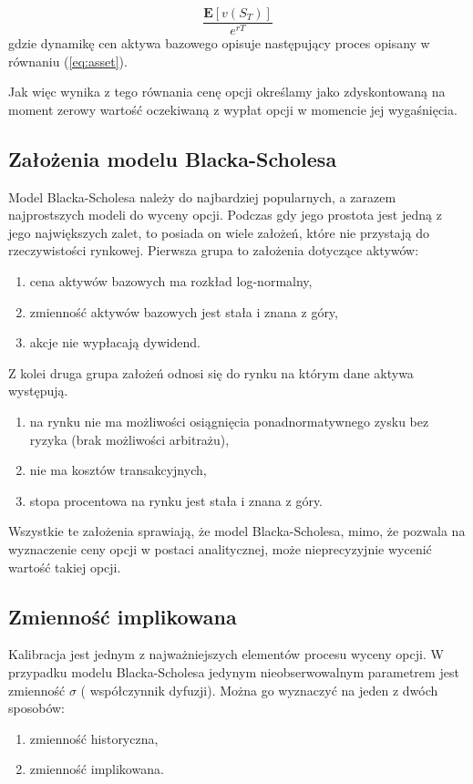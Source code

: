 \documentclass{pracamgr}
\begin{document}
\begin{equation}
\label{eq:discounting}
 \frac{\mathbf{E}[v(S_T)]}{e^{rT}}
\end{equation}
gdzie dynamikę cen aktywa bazowego opisuje następujący proces opisany w równaniu (\ref{eq:asset}).

Jak więc wynika z tego równania cenę opcji określamy jako zdyskontowaną na moment zerowy wartość
oczekiwaną z wypłat opcji w momencie jej wygaśnięcia. 

\subsection{Założenia modelu Blacka-Scholesa} %
\label{sub:zalozenia_modelu_blacka_scholesa}

Model Blacka-Scholesa należy do najbardziej popularnych, a zarazem najprostszych modeli do wyceny 
opcji. Podczas gdy jego prostota jest jedną z jego największych zalet, to posiada on wiele założeń,
które nie przystają do rzeczywistości rynkowej. Pierwsza grupa to założenia dotyczące aktywów:
\begin{enumerate}
\item cena aktywów bazowych ma rozkład log-normalny,
\item zmienność aktywów bazowych jest stała i znana z góry,
\item akcje nie wypłacają dywidend.
\end{enumerate}
Z kolei druga grupa założeń odnosi się do rynku na którym dane aktywa występują.
\begin{enumerate}
\item na rynku nie ma możliwości osiągnięcia ponadnormatywnego zysku bez ryzyka (brak możliwości arbitrażu),
\item nie ma kosztów transakcyjnych,
\item stopa procentowa na rynku jest stała i znana z góry.
\end{enumerate}

Wszystkie te założenia sprawiają, że model Blacka-Scholesa, mimo, że pozwala na wyznaczenie ceny
 opcji w postaci analitycznej, może nieprecyzyjnie wycenić wartość takiej opcji.
  
\subsection{Zmienność implikowana} %
\label{sub:zmienno_implikowana} 
Kalibracja jest jednym z najważniejszych elementów procesu wyceny opcji.
W przypadku modelu Blacka-Scholesa jedynym nieobserwowalnym parametrem jest zmienność $\sigma$ (
współczynnik dyfuzji). Można go wyznaczyć na jeden z dwóch sposobów:
\begin{enumerate}
  \item zmienność historyczna,
  \item zmienność implikowana.
\end{enumerate}
\end{document}
